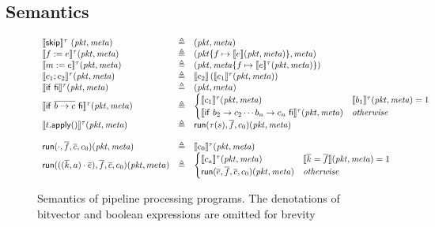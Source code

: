 \subsection{Semantics}
\begin{figure*}
  \[\begin{array}{lcl}
      \llbracket \mathsf{skip} \rrbracket^\tau~(\mathit{pkt},\mathit{meta})
      &\triangleq
      & (\mathit{pkt},\mathit{meta}) \\
      \llbracket f := e \rrbracket^\tau(\mathit{pkt},\mathit{meta})
      &\triangleq
      & (\mathit{pkt}\{f \mapsto \llbracket e \rrbracket(\mathit{pkt},\mathit{meta})\}, \mathit{meta})\\
      \llbracket m := e \rrbracket^\tau(\mathit{pkt}, \mathit{meta})
      &\triangleq
      & (\mathit{pkt}, \mathit{meta}\{f \mapsto \llbracket e \rrbracket^\tau(\mathit{pkt},\mathit{meta})\})\\
      \llbracket c_1;c_2 \rrbracket^\tau(\mathit{pkt}, \mathit{meta})
      &\triangleq
      & \llbracket c_2 \rrbracket\left(\llbracket c_1 \rrbracket^\tau(\mathit{pkt}, \mathit{meta})\right)\\
      \llbracket \mathsf{if}~\mathsf{fi} \rrbracket^\tau(\mathit{pkt}, \mathit{meta})
      & \triangleq
      & (\mathit{pkt}, meta) \\
      \llbracket \mathsf{if}~\overline{b \to c}~\mathsf{fi} \rrbracket^\tau (\mathit{pkt},\mathit{meta})
      & \triangleq & \begin{cases}
        \llbracket c_1 \rrbracket^\tau(\mathit{pkt},\mathit{meta})& \llbracket b_1 \rrbracket^\tau(\mathit{pkt}, \mathit{meta}) = 1 \\
        \llbracket \mathsf{if}~b_2 \to c_2 \cdots b_n \to c_n~\mathsf{fi} \rrbracket^\tau (\mathit{pkt},\mathit{meta}) & \mathit{otherwise}
      \end{cases} \\
      \llbracket t.\mathsf{apply}() \rrbracket^\tau(\mathit{pkt},\mathit{meta})
      & \triangleq
      & \mathop{\textsf{run}}(\tau(s),\overline f, c_0)(\mathit{pkt},\mathit{meta}) \\\\
      \mathop{\textsf{run}}(\cdot, \overline f, \overline c, c_0)(\mathit{pkt}, \mathit{meta})
      & \triangleq
      & \llbracket c_0 \rrbracket^\tau(\mathit{pkt},\mathit{meta}) \\
      \mathop{\textsf{run}}(((\overline k, a)\cdot\overline e), \overline f, \overline c,  c_0) (\mathit{pkt}, meta)
      & \triangleq
      & \begin{cases}
        \llbracket c_a \rrbracket^\tau(\mathit{pkt}, \mathit{meta}) & \llbracket \overline k = \overline f \rrbracket (\mathit{pkt}, \mathit{meta}) = 1 \\
        \mathop{\textsf{run}}(\overline e, \overline f,\overline c, c_0) (\mathit{pkt}, \mathit{meta}) & \mathit{otherwise} \\
        \end{cases}
    \end{array}
  \]
  \caption{Semantics of pipeline processing programs. The denotations
    of bitvector and boolean expressions are omitted for brevity}
\end{figure*}

